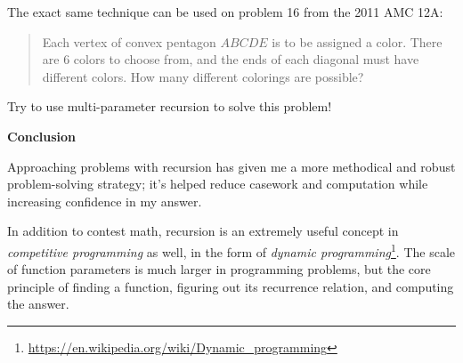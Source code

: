 \documentclass{article}
\begin{document}
The exact same technique can be used on problem 16 from the 2011 AMC 12A:
\begin{quote}
    Each vertex of convex pentagon $ABCDE$ is to be assigned a color. There are $6$ colors to choose from, and the ends of each diagonal must have different colors. How many different colorings are possible?
\end{quote}
Try to use multi-parameter recursion to solve this problem!

\textbf{Conclusion}

Approaching problems with recursion has given me a more methodical and robust problem-solving strategy; it's helped reduce casework and computation while increasing confidence in my answer.

In addition to contest math, recursion is an extremely useful concept in \textit{competitive programming} as well, in the form of \textit{dynamic programming}\footnote{\url{https://en.wikipedia.org/wiki/Dynamic\_programming}}. The scale of function parameters is much larger in programming problems, but the core principle of finding a function, figuring out its recurrence relation, and computing the answer.
\end{document}
